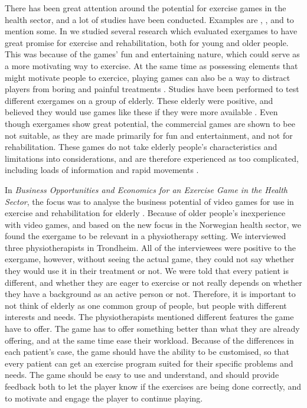 There has been great attention around the potential for exercise games in the health sector, and a lot of studies have been conducted. Examples are \cite{exergamesforelderly}, \cite{gerling1}, \cite{ijsselsteijn2007digital} and \cite{garcia2012exergames} to mention some. In \cite{project} we studied several research which evaluated exergames to have great promise for exercise and rehabilitation, both for young and older people. This was because of the games' fun and entertaining nature, which could serve as a more motivating way to exercise. At the same time as possessing elements that might motivate people to exercice, playing games can also be a way to distract players from boring and painful treatments \cite{taylor2011activity}. Studies have been performed to test different exergames on a group of elderly. These elderly were positive, and believed they would use games like these if they were more available \cite{excell}. Even though exergames show great potential, the commercial games  are shown to bee not suitable, as they are made primarily for fun and entertainment, and not for rehabilitation. These games do not take elderly people's characteristics and limitations into considerations, and are therefore experienced as too complicated, including loads of information and rapid movements \cite{exergamesforelderly}.

In \emph{Business Opportunities and Economics for an Exercise Game in the Health Sector}, the focus was to analyse the business potential of video games for use in exercise and rehabilitation for elderly \cite{project}.  Because of older people's inexperience with video games, and based on the new focus in the Norwegian health sector, we found the exergame to be relevant in a physiotherapy setting. We interviewed three physiotherapists in Trondheim. All of the interviewees were positive to the exergame, however, without seeing the actual game, they could not say whether they would use it in their treatment or not. We were told that every patient is different, and whether they are eager to exercise or not really depends on whether they have a background as an active person or not. Therefore, it is important to not think of elderly as one common group of people, but people with different interests and needs. The physiotherapists mentioned different features the game have to offer. The game has to offer something better than what they are already offering, and at the same time ease their workload. Because of the differences in each patient's case, the game should have the ability to be customised, so that every patient can get an exercise program suited for their specific problems and needs. The game should be easy to use and understand, and should provide feedback both to let the player know if the exercises are being done correctly, and to motivate and engage the player to continue playing. 

